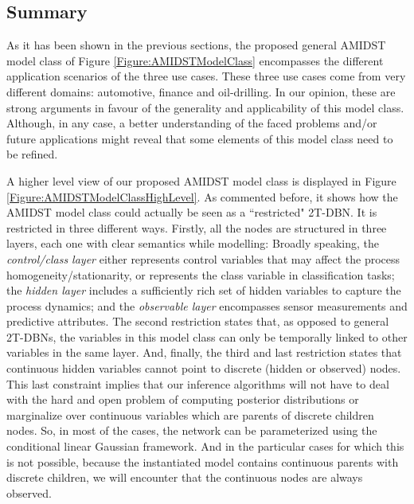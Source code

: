 \subsection{Summary}\label{summaryAMIDSTModels}

As it has been shown in the previous sections, the proposed general AMIDST model class of Figure \ref{Figure:AMIDSTModelClass} encompasses the different application scenarios of the three use cases. These three use cases come from very different domains: automotive, finance and oil-drilling. In our opinion, these are strong arguments in favour of the generality and applicability of this model class. Although, in any case, a better understanding of the faced problems and/or future applications might reveal that some elements of this model class need to be refined.  

A higher level view of our proposed AMIDST model class is displayed in Figure \ref{Figure:AMIDSTModelClassHighLevel}. As commented before, it shows how the AMIDST model class could actually be seen as a ``restricted" 2T-DBN. It is restricted in three different ways. Firstly, all the nodes are structured in three layers, each one with clear semantics while modelling: Broadly speaking, the \textit{control/class layer} either represents control variables that may affect the process homogeneity/stationarity, or represents the class variable in classification tasks; the \textit{hidden layer} includes a sufficiently rich set of hidden variables to capture the process dynamics; and the \textit{observable layer} encompasses sensor measurements and predictive attributes. The second restriction states that, as opposed to general 2T-DBNs, the variables in this model class can only be temporally linked to other variables in the same layer. And, finally, the third and last restriction  states that continuous hidden variables cannot point to discrete (hidden or observed) nodes. This last constraint implies that our inference algorithms will not have to deal with the hard and open problem of computing posterior distributions or marginalize over continuous variables which are parents of discrete children nodes. So, in most of the cases, the network can be parameterized using the conditional linear Gaussian framework. And in the particular cases for which this is not possible, because the instantiated model contains continuous parents with discrete children, we will encounter that the continuous nodes are always observed. 

